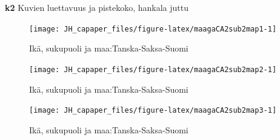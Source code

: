 \documentclass[
  finnish,
]{book}
\begin{document}
\textbf{k2} Kuvien luettavuus ja pistekoko, hankala juttu

\begin{figure}

{\centering \texttt{[image: JH\_capaper\_files/figure-latex/maagaCA2sub2map1-1]} 

}

\caption{Ikä, sukupuoli ja maa:Tanska-Saksa-Suomi}\label{fig:maagaCA2sub2map1}
\end{figure}

\begin{figure}

{\centering \texttt{[image: JH\_capaper\_files/figure-latex/maagaCA2sub2map2-1]} 

}

\caption{Ikä, sukupuoli ja maa:Tanska-Saksa-Suomi}\label{fig:maagaCA2sub2map2}
\end{figure}

\begin{figure}

{\centering \texttt{[image: JH\_capaper\_files/figure-latex/maagaCA2sub2map3-1]} 

}

\caption{Ikä, sukupuoli ja maa:Tanska-Saksa-Suomi}\label{fig:maagaCA2sub2map3}
\end{figure}
\end{document}
